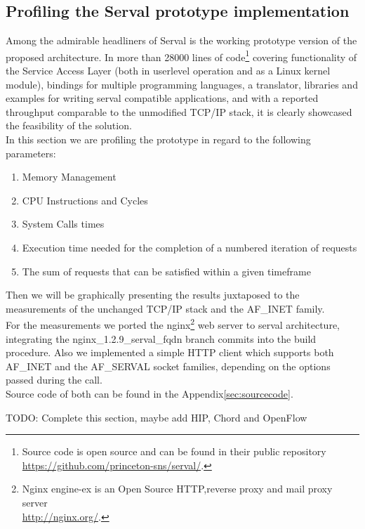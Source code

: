 \subsection{Profiling the Serval prototype implementation}
Among the admirable headliners of Serval is the working prototype version of the proposed architecture.
In more than 28000 lines of code\footnote{Source code is open source and can be found in their public repository\\ \url{https://github.com/princeton-sns/serval/}.} covering functionality of the Service Access Layer (both in userlevel operation and as a Linux kernel module), bindings for multiple programming languages, a translator, libraries and examples for writing serval compatible applications, and with a reported throughput comparable to the unmodified TCP/IP stack, it is clearly showcased the feasibility of the solution.\\
\indent In this section we are profiling the prototype in regard to the following parameters:
\begin{enumerate}
  \item Memory Management
  \item CPU Instructions and Cycles
  \item System Calls times
  \item Execution time needed for the completion of a numbered iteration of requests
  \item The sum of requests that can be satisfied within a given timeframe
\end{enumerate}
Then we will be graphically presenting the results juxtaposed to the measurements of the unchanged TCP/IP stack and the AF\_INET family.\\
For the measurements we ported the nginx\footnote{Nginx engine-ex is an Open Source HTTP,reverse proxy and mail proxy server\\ \url{http://nginx.org/}.} web server to serval architecture, integrating the nginx\_1.2.9\_serval\_fqdn branch commits into the build procedure.
Also we implemented a simple HTTP client which supports both AF\_INET and the AF\_SERVAL socket families, depending on the options passed during the call.\\
Source code of both can be found in the Appendix\ref{sec:sourcecode}.


\iffalse
1) memory (oprofile)
2) CPU cycles (callgrind)
3) system calls time (strace)
4) timed execution of 1000 times
5) requests per second
\fi

TODO: Complete this section, maybe add HIP, Chord and OpenFlow